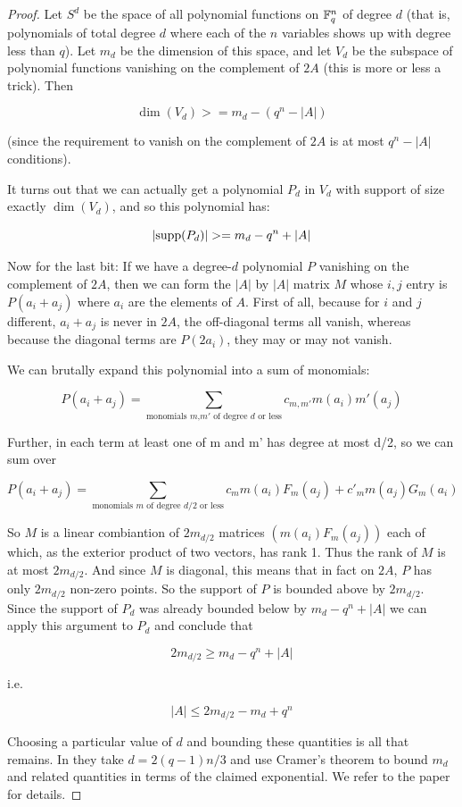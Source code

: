 \documentclass{report}
\theoremstyle{remark}
\numberwithin{equation}{section}
\begin{document}
\begin{proof}Let $S^d$ be the space of all polynomial functions on
  $\mathbb{F}_q^n$ of degree $d$ (that is, polynomials of total degree $d$
  where each of the $n$ variables shows up with degree less than $q$).
  Let $m_d$ be the dimension of this space, and let $V_d$ be the
  subspace of polynomial functions vanishing on the complement of $2A$
  (this is more or less a trick).  Then

  \[\dim(V_d) >= m_d - (q^n - |A|)\]
  
  (since the requirement to vanish on the complement of $2A$ is at most
  $q^n - |A|$ conditions).
  
  It turns out that we can actually get a polynomial $P_d$ in $V_d$ with
  support of size exactly $\dim(V_d)$, and so this polynomial has:
  
  \[|\text{supp}(P_d)| >= m_d - q^n + |A|\]
  
  Now for the last bit: If we have a degree-$d$ polynomial $P$
  vanishing on the complement of $2A$, then we can form the $|A|$ by
  $|A|$ matrix $M$ whose $i,j$ entry is $P(a_i + a_j)$ where $a_i$ are
  the elements of $A$.  First of all, because for $i$ and $j$
  different, $a_i+a_j$ is never in $2A$, the off-diagonal terms all
  vanish, whereas because the diagonal terms are $P(2a_i)$, they may
  or may not vanish.
  
  
  We can brutally expand this polynomial into a sum of monomials:
  
  \[P(a_i + a_j) = \sum_{\text{monomials $m$,$m'$ of degree $d$ or less}} c_{m,m'} m(a_i) m'(a_j)\]
  
  Further, in each term at least one of m and m' has degree at most d/2, so we can sum over 
  
  \[P(a_i + a_j) = \displaystyle\sum_{\text{monomials $m$ of degree $d/2$ or less}} c_{m} m(a_i) F_m(a_j) + c'_m m(a_j) G_m(a_i)\]
  
  So $M$ is a linear combiantion of $2 m_{d/2}$ matrices $(m(a_i)
  F_m(a_j))$ each of which, as the exterior product of two vectors, has
  rank 1.  Thus the rank of $M$ is at most $2 m_{d/2}$.  And since $M$ is
  diagonal, this means that in fact on $2A$, $P$ has only $2 m_{d/2}$ non-zero
  points.  So the support of $P$ is bounded above by $2 m_{d/2}$.  Since the
  support of $P_d$ was already bounded below by $m_d - q^n + |A|$ we can
  apply this argument to $P_d$ and conclude that
  
  \[2 m_{d/2} \geq m_d - q^n + |A|\]
  
  i.e.
  
  \[|A| \leq 2 m_{d/2} - m_d + q^n\]

  Choosing a particular value of $d$ and bounding these quantities is
  all that remains.  In \cite{ellenberg:preprint} they take
  $d = 2(q-1)n/3$ and use Cramer's theorem to bound $m_d$ and related
  quantities in terms of the claimed exponential.  We refer to the
  paper for details.
\end{proof}
\end{document}
